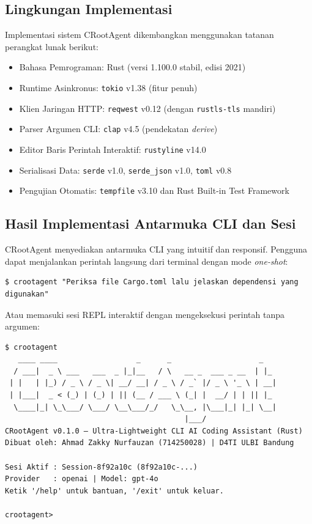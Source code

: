 \subsection{Lingkungan Implementasi}
Implementasi sistem CRootAgent dikembangkan menggunakan tatanan perangkat lunak berikut:
\begin{itemize}[noitemsep]
    \item Bahasa Pemrograman: Rust (versi 1.100.0 stabil, edisi 2021)
    \item Runtime Asinkronus: \texttt{tokio} v1.38 (fitur penuh)
    \item Klien Jaringan HTTP: \texttt{reqwest} v0.12 (dengan \texttt{rustls-tls} mandiri)
    \item Parser Argumen CLI: \texttt{clap} v4.5 (pendekatan \textit{derive})
    \item Editor Baris Perintah Interaktif: \texttt{rustyline} v14.0
    \item Serialisasi Data: \texttt{serde} v1.0, \texttt{serde\_json} v1.0, \texttt{toml} v0.8
    \item Pengujian Otomatis: \texttt{tempfile} v3.10 dan Rust Built-in Test Framework
\end{itemize}

\subsection{Hasil Implementasi Antarmuka CLI dan Sesi}
CRootAgent menyediakan antarmuka CLI yang intuitif dan responsif. Pengguna dapat menjalankan perintah langsung dari terminal dengan mode \textit{one-shot}:

\begin{verbatim}
$ crootagent "Periksa file Cargo.toml lalu jelaskan dependensi yang digunakan"
\end{verbatim}

Atau memasuki sesi REPL interaktif dengan mengeksekusi perintah tanpa argumen:

\begin{verbatim}
$ crootagent
   ____ ____                  _      _                    _   
  / ___|  _ \ ___   ___  _ |_|__   / \   __ _  ___ _ __  | |_ 
 | |   | |_) / _ \ / _ \| __/ __| / _ \ / _` |/ _ \ '_ \ | __|
 | |___|  _ < (_) | (_) | || (__ / ___ \ (_| |  __/ | | || |_ 
  \____|_| \_\___/ \___/ \__\___/_/   \_\__, |\___|_| |_| \__|
                                         |___/                 
CRootAgent v0.1.0 — Ultra-Lightweight CLI AI Coding Assistant (Rust)
Dibuat oleh: Ahmad Zakky Nurfauzan (714250028) | D4TI ULBI Bandung

Sesi Aktif : Session-8f92a10c (8f92a10c-...)
Provider   : openai | Model: gpt-4o
Ketik '/help' untuk bantuan, '/exit' untuk keluar.

crootagent> 
\end{verbatim}

